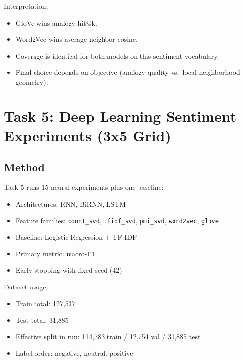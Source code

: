 \documentclass[11pt]{article}
\begin{document}
Interpretation:
\begin{itemize}
    \item GloVe wins analogy hit@k.
    \item Word2Vec wins average neighbor cosine.
    \item Coverage is identical for both models on this sentiment vocabulary.
    \item Final choice depends on objective (analogy quality vs.\ local neighborhood geometry).
\end{itemize}

\section{Task 5: Deep Learning Sentiment Experiments (3x5 Grid)}
\subsection{Method}
Task 5 runs 15 neural experiments plus one baseline:
\begin{itemize}
    \item Architectures: RNN, BiRNN, LSTM
    \item Feature families: \texttt{count\_svd}, \texttt{tfidf\_svd}, \texttt{pmi\_svd}, \texttt{word2vec}, \texttt{glove}
    \item Baseline: Logistic Regression + TF-IDF
    \item Primary metric: macro-F1
    \item Early stopping with fixed seed (\(42\))
\end{itemize}

Dataset usage:
\begin{itemize}
    \item Train total: 127{,}537
    \item Test total: 31{,}885
    \item Effective split in run: 114{,}783 train / 12{,}754 val / 31{,}885 test
    \item Label order: negative, neutral, positive
\end{itemize}
\end{document}
